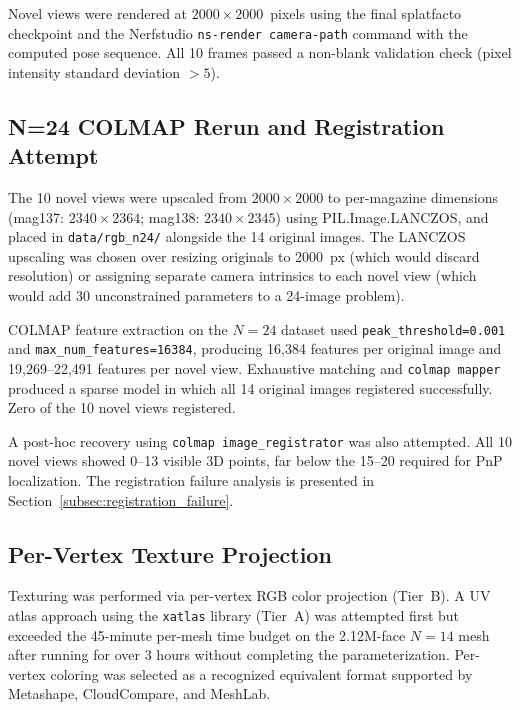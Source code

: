 \documentclass[12pt]{article}
\begin{document}
Novel views were rendered at $2000 \times 2000$~pixels using the final splatfacto checkpoint and the Nerfstudio \texttt{ns-render camera-path} command with the computed pose sequence. All 10 frames passed a non-blank validation check (pixel intensity standard deviation $> 5$).

\subsection{N=24 COLMAP Rerun and Registration Attempt}

The 10 novel views were upscaled from $2000 \times 2000$ to per-magazine dimensions (mag137: $2340 \times 2364$; mag138: $2340 \times 2345$) using PIL.Image.LANCZOS, and placed in \texttt{data/rgb\_n24/} alongside the 14 original images. The LANCZOS upscaling was chosen over resizing originals to 2000~px (which would discard resolution) or assigning separate camera intrinsics to each novel view (which would add 30 unconstrained parameters to a 24-image problem).

COLMAP feature extraction on the $N{=}24$ dataset used \texttt{peak\_threshold=0.001} and \texttt{max\_num\_features=16384}, producing 16,384 features per original image and 19,269--22,491 features per novel view. Exhaustive matching and \texttt{colmap mapper} produced a sparse model in which all 14 original images registered successfully. Zero of the 10 novel views registered.

A post-hoc recovery using \texttt{colmap image\_registrator} was also attempted. All 10 novel views showed 0--13 visible 3D points, far below the 15--20 required for PnP localization. The registration failure analysis is presented in Section~\ref{subsec:registration_failure}.

\subsection{Per-Vertex Texture Projection}
\label{subsec:texturing}

Texturing was performed via per-vertex RGB color projection (Tier~B). A UV atlas approach using the \texttt{xatlas} library (Tier~A) was attempted first but exceeded the 45-minute per-mesh time budget on the 2.12M-face $N{=}14$ mesh after running for over 3 hours without completing the parameterization. Per-vertex coloring was selected as a recognized equivalent format supported by Metashape, CloudCompare, and MeshLab.
\end{document}
